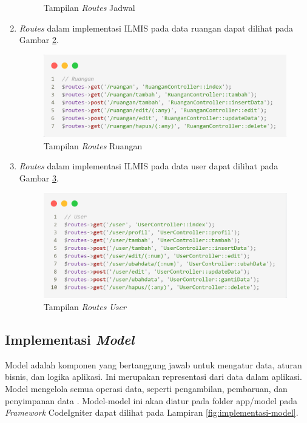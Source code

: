 \begin{enumerate}
\begin{figure}
		      \caption{Tampilan \textit{Routes} Jadwal}
		      \label{fig:routes-jadwal}
	      \end{figure}
	\item \textit{Routes} dalam implementasi ILMIS pada data ruangan dapat dilihat pada Gambar \ref{fig:routes-ruangan}.
	      \begin{figure}
		      \centering
		      \includegraphics[width=1\linewidth]{konten//gambar/routes/ruangan.png}
		      \caption{Tampilan \textit{Routes} Ruangan}
		      \label{fig:routes-ruangan}
	      \end{figure}
	\item \textit{Routes} dalam implementasi ILMIS pada data user dapat dilihat pada Gambar \ref{fig:routes-user}.
	      \begin{figure}
		      \centering
		      \includegraphics[width=1\linewidth]{konten//gambar/routes/user.png}
		      \caption{Tampilan \textit{Routes} \textit{User}}
		      \label{fig:routes-user}
	      \end{figure}
\end{enumerate}

\subsection{Implementasi \textit{Model}}
Model adalah komponen yang bertanggung jawab untuk mengatur data, aturan bisnis, dan logika aplikasi. Ini merupakan representasi dari data dalam aplikasi. Model mengelola semua operasi data, seperti pengambilan, pembaruan, dan penyimpanan data \cite{firdaus2020rancang}. Model-model ini akan diatur pada folder app/model pada \textit{Framework} CodeIgniter dapat dilihat pada Lampiran \ref{fig:implementasi-model}.


